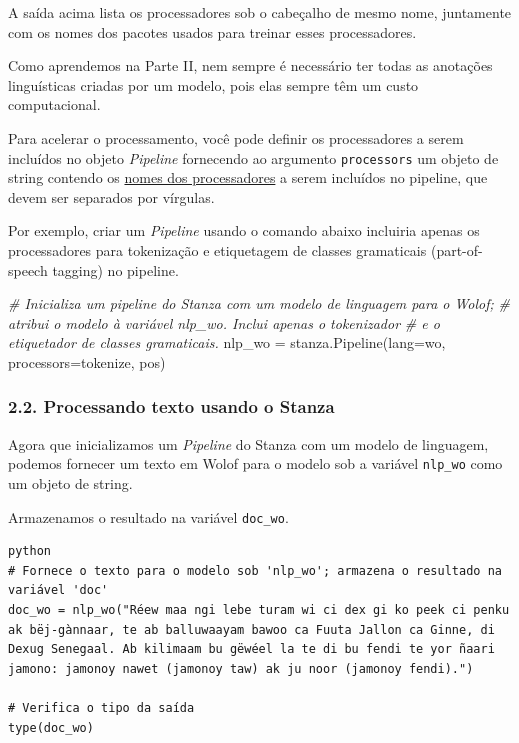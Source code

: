\documentclass[
  brazilian,
]{article}
\newenvironment{Shaded}{}{}
\newcommand{\CommentTok}[1]{\textcolor[rgb]{0.38,0.63,0.69}{\textit{#1}}}
\newcommand{\NormalTok}[1]{#1}
\newcommand{\OperatorTok}[1]{\textcolor[rgb]{0.40,0.40,0.40}{#1}}
\newcommand{\StringTok}[1]{\textcolor[rgb]{0.25,0.44,0.63}{#1}}
\begin{document}
A saída acima lista os processadores sob o cabeçalho de mesmo nome,
juntamente com os nomes dos pacotes usados para treinar esses
processadores.

Como aprendemos na Parte II, nem sempre é necessário ter todas as
anotações linguísticas criadas por um modelo, pois elas sempre têm um
custo computacional.

Para acelerar o processamento, você pode definir os processadores a
serem incluídos no objeto \emph{Pipeline} fornecendo ao argumento
\texttt{processors} um objeto de string contendo os
\href{https://stanfordnlp.github.io/stanza/pipeline.html\#processors}{nomes
dos processadores} a serem incluídos no pipeline, que devem ser
separados por vírgulas.

Por exemplo, criar um \emph{Pipeline} usando o comando abaixo incluiria
apenas os processadores para tokenização e etiquetagem de classes
gramaticais (part-of-speech tagging) no pipeline.

\begin{Shaded}
\begin{Highlighting}[]
\CommentTok{\# Inicializa um pipeline do Stanza com um modelo de linguagem para o Wolof;}
\CommentTok{\# atribui o modelo à variável \textquotesingle{}nlp\_wo\textquotesingle{}. Inclui apenas o tokenizador }
\CommentTok{\# e o etiquetador de classes gramaticais.}
\NormalTok{nlp\_wo }\OperatorTok{=}\NormalTok{ stanza.Pipeline(lang}\OperatorTok{=}\StringTok{\textquotesingle{}wo\textquotesingle{}}\NormalTok{, processors}\OperatorTok{=}\StringTok{\textquotesingle{}tokenize, pos\textquotesingle{}}\NormalTok{)}
\end{Highlighting}
\end{Shaded}

\hypertarget{processando-texto-usando-o-stanza}{%
\subsubsection{2.2. Processando texto usando o
Stanza}\label{processando-texto-usando-o-stanza}}

Agora que inicializamos um \emph{Pipeline} do Stanza com um modelo de
linguagem, podemos fornecer um texto em Wolof para o modelo sob a
variável \texttt{nlp\_wo} como um objeto de string.

Armazenamos o resultado na variável \texttt{doc\_wo}.

\begin{verbatim}
python
# Fornece o texto para o modelo sob 'nlp_wo'; armazena o resultado na variável 'doc'
doc_wo = nlp_wo("Réew maa ngi lebe turam wi ci dex gi ko peek ci penku ak bëj-gànnaar, te ab balluwaayam bawoo ca Fuuta Jallon ca Ginne, di Dexug Senegaal. Ab kilimaam bu gëwéel la te di bu fendi te yor ñaari jamono: jamonoy nawet (jamonoy taw) ak ju noor (jamonoy fendi).")

# Verifica o tipo da saída
type(doc_wo)
\end{verbatim}
\end{document}
